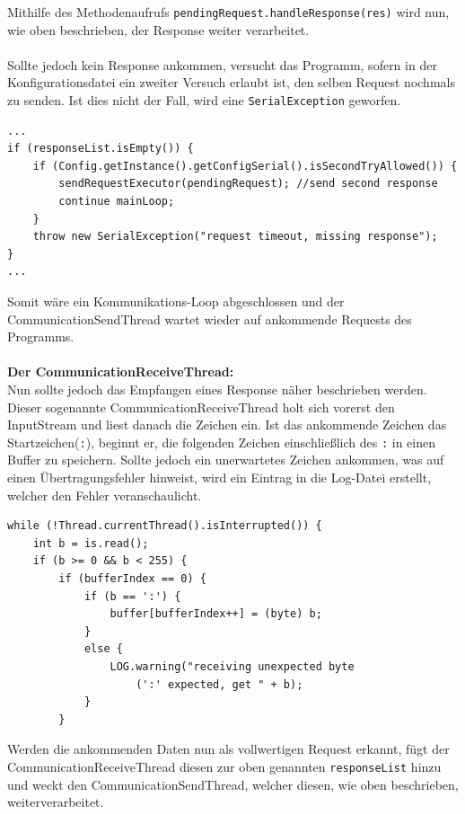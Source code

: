 Mithilfe des Methodenaufrufs \lstinline[style=java]{pendingRequest.handleResponse(res)} wird nun, wie oben beschrieben, der Response weiter verarbeitet.\\\\
Sollte jedoch kein Response ankommen, versucht das Programm, sofern in der Konfigurationsdatei ein zweiter Versuch erlaubt ist, den selben Request nochmals zu senden.
Ist dies nicht der Fall, wird eine \lstinline[style=java]{SerialException} geworfen.
\begin{lstlisting}[style=java,caption=Teilabschnitt CommunicationSendThread,label=commThreadSend]
...
if (responseList.isEmpty()) {
    if (Config.getInstance().getConfigSerial().isSecondTryAllowed()) {
        sendRequestExecutor(pendingRequest); //send second response
        continue mainLoop;
    }
    throw new SerialException("request timeout, missing response");
}
...
\end{lstlisting}
Somit wäre ein Kommunikations-Loop abgeschlossen und der CommunicationSendThread wartet wieder auf ankommende Requests des Programms.\\\\
\textbf{Der CommunicationReceiveThread:}\\
Nun sollte jedoch das Empfangen eines Response näher beschrieben werden.
Dieser sogenannte CommunicationReceiveThread holt sich vorerst den InputStream und liest danach die Zeichen ein.
Ist das ankommende Zeichen das Startzeichen(\lstinline[style=java]{:}), beginnt er, die folgenden Zeichen einschließlich des \lstinline[style=java]{:} in einen Buffer zu speichern.
Sollte jedoch ein unerwartetes Zeichen ankommen, was auf einen Übertragungsfehler hinweist, wird ein Eintrag in die Log-Datei erstellt, welcher den Fehler veranschaulicht.
\begin{lstlisting}[style=java,caption=Teilabschnitt CommunicationReceiveThread,label=commThreadSend]
while (!Thread.currentThread().isInterrupted()) {
    int b = is.read();
    if (b >= 0 && b < 255) {
        if (bufferIndex == 0) {
            if (b == ':') {
                buffer[bufferIndex++] = (byte) b;
            }
            else {
                LOG.warning("receiving unexpected byte
                    (':' expected, get " + b);
            }
        }
\end{lstlisting}
Werden die ankommenden Daten nun als vollwertigen Request erkannt, fügt der CommunicationReceiveThread diesen zur oben genannten \lstinline[style=java]{responseList} hinzu und weckt den CommunicationSendThread, welcher diesen, wie oben beschrieben, weiterverarbeitet.
